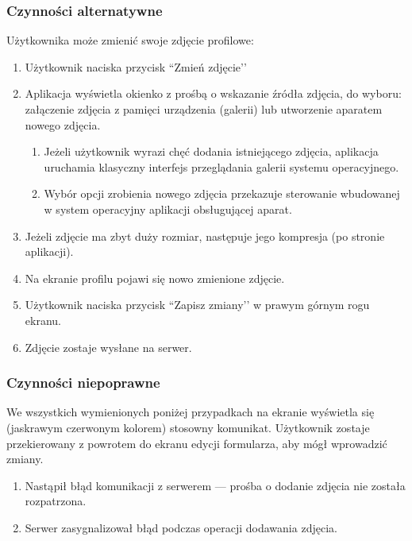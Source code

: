 \documentclass[12pt,a4paper,twoside]{article}
\begin{document}
    \subsubsection{Czynności alternatywne}
    Użytkownika może zmienić swoje zdjęcie profilowe:
    \begin{enumerate}
        \item Użytkownik naciska przycisk ``Zmień zdjęcie’’
        \item Aplikacja wyświetla okienko z prośbą o wskazanie źródła zdjęcia, do wyboru: załączenie zdjęcia z pamięci urządzenia (galerii)
        lub utworzenie aparatem nowego zdjęcia.
        \begin{enumerate}
            \item Jeżeli użytkownik wyrazi chęć dodania istniejącego zdjęcia, aplikacja uruchamia klasyczny interfejs przeglądania galerii
            systemu operacyjnego.
            \item Wybór opcji zrobienia nowego zdjęcia przekazuje sterowanie wbudowanej w system operacyjny aplikacji obsługującej aparat.
        \end{enumerate}
        \item Jeżeli zdjęcie ma zbyt duży rozmiar, następuje jego kompresja (po stronie aplikacji).
        \item Na ekranie profilu pojawi się nowo zmienione zdjęcie.
        \item Użytkownik naciska przycisk ``Zapisz zmiany’’ w prawym górnym rogu ekranu.
        \item Zdjęcie zostaje wysłane na serwer.
    \end{enumerate}
    
    
    \subsubsection{Czynności niepoprawne}
    We wszystkich wymienionych poniżej przypadkach na ekranie wyświetla się (jaskrawym czerwonym kolorem) stosowny komunikat. Użytkownik zostaje
    przekierowany z powrotem do ekranu edycji formularza, aby mógł wprowadzić zmiany.
    \begin{enumerate}
        \item Nastąpił błąd komunikacji z serwerem --- prośba o dodanie zdjęcia nie została rozpatrzona.
        \item Serwer zasygnalizował błąd podczas operacji dodawania zdjęcia.
    \end{enumerate}
    
\end{document}
